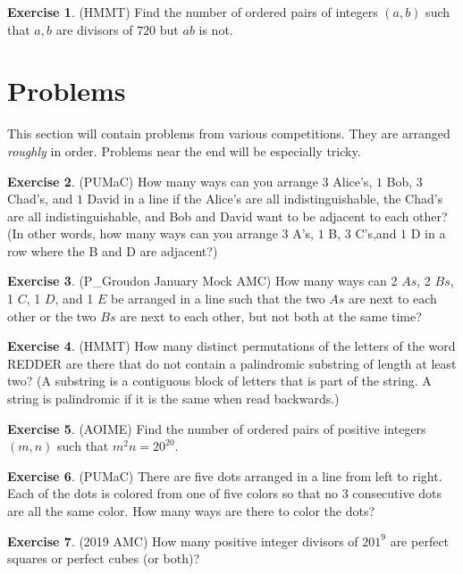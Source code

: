 \documentclass[l1pt]{article}
\theoremstyle{plain}
\theoremstyle{definition}
\newtheorem{exercise}{Exercise}[section]
\theoremstyle{remark}
\begin{document}
\begin{exercise}
(HMMT) Find the number of ordered pairs of integers $(a, b)$ such that $a, b$ are divisors of $720$ but $ab$ is not.
\end{exercise}

\section{Problems}
This section will contain problems from various competitions. They are arranged \textit{roughly} in order. Problems near the end will be especially tricky.

\begin{exercise}
(PUMaC) How many ways can you arrange $3$ Alice’s, $1$ Bob, $3$ Chad’s, and $1$ David in a line if the Alice’s are all indistinguishable, the Chad’s are all indistinguishable, and Bob and David want to be adjacent to each other? (In other words, how many ways can you arrange $3$ A’s, $1$ B, $3$ C’s,and $1$ D in a row where the B and D are adjacent?)
\end{exercise}

\begin{exercise}
(P\_Groudon January Mock AMC) How many ways can 2 $As$, 2 $Bs$, 1 $C$, 1 $D$, and 1 $E$ be arranged in a line such that the two $As$ are next to each other or the two $Bs$ are next to each other, but not both at the same time?
\end{exercise}

\begin{exercise}
(HMMT) How many distinct permutations of the letters of the word REDDER are there that do not contain a palindromic substring of length at least two? (A substring is a contiguous block of letters that is part of the string. A string is palindromic if it is the same when read backwards.)
\end{exercise}

\begin{exercise}
(AOIME) Find the number of ordered pairs of positive integers $(m,n)$ such that ${m^2n = 20 ^{20}}$.
\end{exercise}

\begin{exercise}
(PUMaC) There are five dots arranged in a line from left to right. Each of the dots is colored from one of five colors so that no $3$ consecutive dots are all the same color. How many ways are there to color the dots?
\end{exercise}

\begin{exercise}
(2019 AMC) How many positive integer divisors of $201^9$ are perfect squares or perfect cubes (or both)?
\end{exercise}
\end{document}
